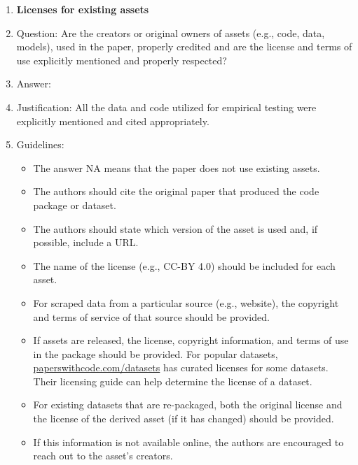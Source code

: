 \documentclass{article}
\theoremstyle{plain}
\theoremstyle{definition}
\theoremstyle{remark}
\begin{document}
\begin{enumerate}
\item {\bf Licenses for existing assets}
    \item[] Question: Are the creators or original owners of assets (e.g., code, data, models), used in the paper, properly credited and are the license and terms of use explicitly mentioned and properly respected?
    \item[] Answer: \answerYes{} %
    \item[] Justification: All the data and code utilized for empirical testing were explicitly mentioned and cited appropriately.
    \item[] Guidelines:
    \begin{itemize}
        \item The answer NA means that the paper does not use existing assets.
        \item The authors should cite the original paper that produced the code package or dataset.
        \item The authors should state which version of the asset is used and, if possible, include a URL.
        \item The name of the license (e.g., CC-BY 4.0) should be included for each asset.
        \item For scraped data from a particular source (e.g., website), the copyright and terms of service of that source should be provided.
        \item If assets are released, the license, copyright information, and terms of use in the package should be provided. For popular datasets, \url{paperswithcode.com/datasets} has curated licenses for some datasets. Their licensing guide can help determine the license of a dataset.
        \item For existing datasets that are re-packaged, both the original license and the license of the derived asset (if it has changed) should be provided.
        \item If this information is not available online, the authors are encouraged to reach out to the asset's creators.
    \end{itemize}


\end{enumerate}
\end{document}
